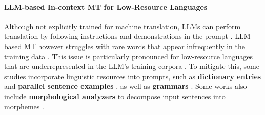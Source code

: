 \paragraph{LLM-based In-context MT for Low-Resource Languages}
Although not explicitly trained for machine translation, LLMs can perform translation by following instructions and demonstrations in the prompt \citep{NEURIPS2020_1457c0d6,lin-etal-2022-shot,vilar-etal-2023-prompting}. LLM-based MT however struggles with rare words that appear infrequently in the training data \citep{ghazvininejad2023dictionarybasedphraselevelpromptinglarge}. This issue is particularly pronounced for low-resource languages that are underrepresented in the LLM's training corpora \citep{workshop2023bloom176bparameteropenaccessmultilingual,touvron2023llama2openfoundation}.
To mitigate this, some studies incorporate linguistic resources into prompts, such as \textbf{dictionary entries} and \textbf{parallel sentence examples} \citep{ghazvininejad2023dictionarybasedphraselevelpromptinglarge,zhang-etal-2024-teaching}, as well as \textbf{grammars} \citep{tanzer2024a,hus-anastasopoulos-2024-back}. Some works also include \textbf{morphological analyzers} to decompose input sentences into morphemes \citep{zhang-etal-2024-hire}.
